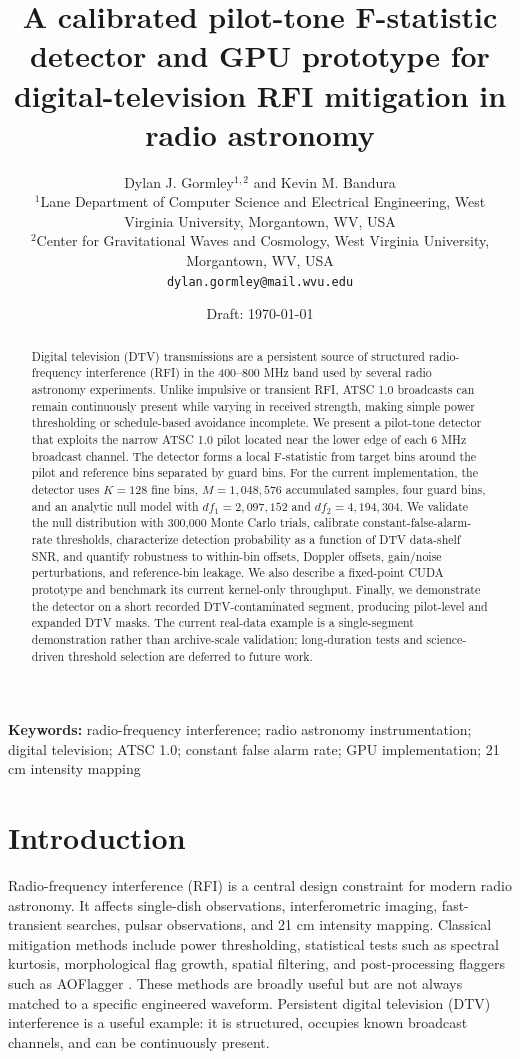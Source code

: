 \documentclass[10pt,letterpaper]{article}
\title{A calibrated pilot-tone F-statistic detector and GPU prototype for digital-television RFI mitigation in radio astronomy}
\author{\begin{tabular}{c}
Dylan J. Gormley$^{1,2}$ and Kevin M. Bandura\\[1mm]
\small $^{1}$Lane Department of Computer Science and Electrical Engineering, West Virginia University, Morgantown, WV, USA\\
\small $^{2}$Center for Gravitational Waves and Cosmology, West Virginia University, Morgantown, WV, USA\\[1mm]
\small \texttt{dylan.gormley@mail.wvu.edu}
\end{tabular}}
\date{Draft: \today}
\begin{document}
\maketitle

\begin{center}

\end{center}

\begin{abstract}
Digital television (DTV) transmissions are a persistent source of structured radio-frequency interference (RFI) in the 400--800 MHz band used by several radio astronomy experiments. Unlike impulsive or transient RFI, ATSC 1.0 broadcasts can remain continuously present while varying in received strength, making simple power thresholding or schedule-based avoidance incomplete. We present a pilot-tone detector that exploits the narrow ATSC 1.0 pilot located near the lower edge of each 6 MHz broadcast channel. The detector forms a local F-statistic from target bins around the pilot and reference bins separated by guard bins. For the current implementation, the detector uses $K=128$ fine bins, $M=1{,}048{,}576$ accumulated samples, four guard bins, and an analytic null model with $df_1=2{,}097{,}152$ and $df_2=4{,}194{,}304$. We validate the null distribution with 300,000 Monte Carlo trials, calibrate constant-false-alarm-rate thresholds, characterize detection probability as a function of DTV data-shelf SNR, and quantify robustness to within-bin offsets, Doppler offsets, gain/noise perturbations, and reference-bin leakage. We also describe a fixed-point CUDA prototype and benchmark its current kernel-only throughput. Finally, we demonstrate the detector on a short recorded DTV-contaminated segment, producing pilot-level and expanded DTV masks. The current real-data example is a single-segment demonstration rather than archive-scale validation; long-duration tests and science-driven threshold selection are deferred to future work.
\end{abstract}

\noindent\textbf{Keywords:} radio-frequency interference; radio astronomy instrumentation; digital television; ATSC 1.0; constant false alarm rate; GPU implementation; 21 cm intensity mapping

\section{Introduction}

Radio-frequency interference (RFI) is a central design constraint for modern radio astronomy. It affects single-dish observations, interferometric imaging, fast-transient searches, pulsar observations, and 21 cm intensity mapping. Classical mitigation methods include power thresholding, statistical tests such as spectral kurtosis, morphological flag growth, spatial filtering, and post-processing flaggers such as AOFlagger \cite{FridmanBaan2001,Nita2007,NitaGary2010,Offringa2012,Mesarcik2022}. These methods are broadly useful but are not always matched to a specific engineered waveform. Persistent digital television (DTV) interference is a useful example: it is structured, occupies known broadcast channels, and can be continuously present.
\end{document}
